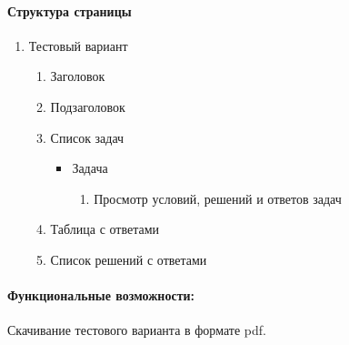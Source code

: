 \paragraph{Структура страницы}
\begin{enumerate}
	\item Тестовый вариант
	\begin{enumerate}
		\item Заголовок
		\item Подзаголовок
		\item Список задач
		\begin{itemize}
		\item Задача
		\begin{enumerate}
			\item Просмотр условий, решений и ответов задач
		\end{enumerate}
		\end{itemize}
		\item Таблица с ответами
		\item Список решений с ответами
	\end{enumerate}
\end{enumerate}

\paragraph{Функциональные возможности:} Скачивание тестового варианта в формате pdf.
